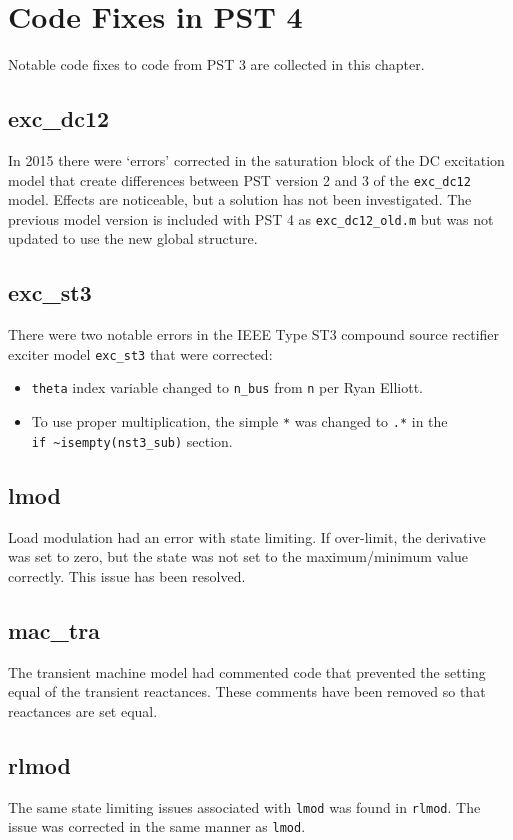 \chapter{Code Fixes in PST 4}
Notable code fixes to code from PST 3 are collected in this chapter.

\section{exc\_dc12}  
In 2015 there were `errors' corrected in the saturation block  of the DC excitation model that create differences between PST version 2 and 3 of the \verb|exc_dc12| model.
Effects are noticeable, but a solution has not been investigated.
The previous model version is included with PST 4 as \verb|exc_dc12_old.m| but was not updated to use the new global structure.

\section{exc\_st3}  
There were two notable errors in the IEEE Type ST3 compound source rectifier exciter model \verb|exc_st3| that were corrected:
\begin{itemize}
\singlespacing
{} em
\item \verb|theta| index variable changed to \verb|n_bus| from \verb|n| per Ryan Elliott.
\item To use proper multiplication, the simple \verb|*| was changed to \verb|.*| in the \\ \verb|if ~isempty(nst3_sub)| section.
\end{itemize}

\section{lmod}  
Load modulation had an error with state limiting.
If over-limit, the derivative was set to zero, but the state was not set to the maximum/minimum value correctly.
This issue has been resolved.
 
\section{mac\_tra}  
The transient machine model had commented code that prevented the setting equal of the transient reactances.
These comments have been removed so that reactances are set equal.

\section{rlmod}  
The same state limiting issues associated with \verb|lmod| was found in \verb|rlmod|.
The issue was corrected in the same manner as \verb|lmod|.